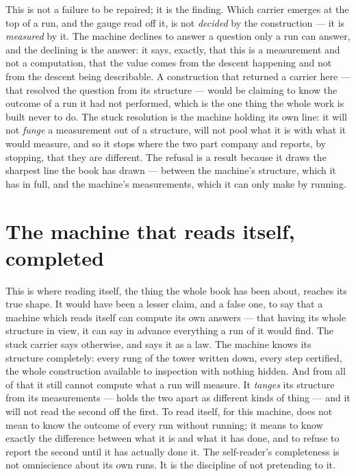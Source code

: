 This is not a failure to be repaired; it is the finding. Which carrier emerges at the top of a run, and the
gauge read off it, is not \emph{decided} by the construction --- it is \emph{measured} by it. The machine
declines to answer a question only a run can answer, and the declining is the answer: it says, exactly, that
this is a measurement and not a computation, that the value comes from the descent happening and not from
the descent being describable. A construction that returned a carrier here --- that resolved the question
from its structure --- would be claiming to know the outcome of a run it had not performed, which is the one
thing the whole work is built never to do. The stuck resolution is the machine holding its own line: it will
not \emph{funge} a measurement out of a structure, will not pool what it is with what it would measure, and
so it stops where the two part company and reports, by stopping, that they are different. The refusal is a
result because it draws the sharpest line the book has drawn --- between the machine's structure, which it
has in full, and the machine's measurements, which it can only make by running.

\section{The machine that reads itself, completed}
\label{se:machine-reads-itself-completed}

This is where reading itself, the thing the whole book has been about, reaches its true shape. It would have
been a lesser claim, and a false one, to say that a machine which reads itself can compute its own answers
--- that having its whole structure in view, it can say in advance everything a run of it would find. The
stuck carrier says otherwise, and says it as a law. The machine knows its structure completely: every rung
of the tower written down, every step certified, the whole construction available to inspection with nothing
hidden. And from all of that it still cannot compute what a run will measure. It \emph{tanges} its structure
from its measurements --- holds the two apart as different kinds of thing --- and it will not read the second
off the first. To read itself, for this machine, does not mean to know the outcome of every run without
running; it means to know exactly the difference between what it is and what it has done, and to refuse to
report the second until it has actually done it. The self-reader's completeness is not omniscience about its
own runs. It is the discipline of not pretending to it.

